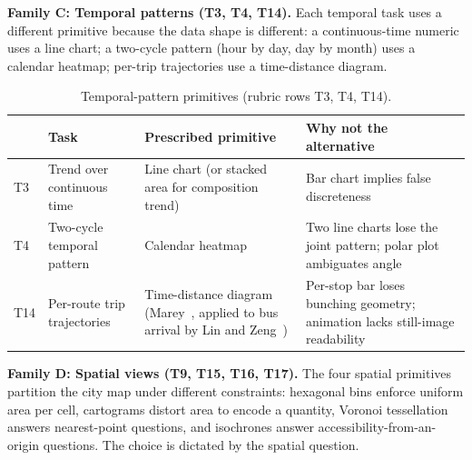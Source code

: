 \textbf{Family C: Temporal patterns (T3, T4, T14).}
Each temporal task uses a different primitive because the data shape
is different: a continuous-time numeric uses a line chart; a
two-cycle pattern (hour by day, day by month) uses a calendar
heatmap; per-trip trajectories use a time-distance diagram.

\begin{table}[!htbp]
\centering
\caption{Temporal-pattern primitives (rubric rows T3, T4, T14).}
\label{tab:foundations:rubric:time}
\footnotesize
\renewcommand{\arraystretch}{1.25}
\begin{tabularx}{\linewidth}{p{0.5cm} p{4.0cm} X X}
\hline
& \textbf{Task} & \textbf{Prescribed primitive} & \textbf{Why not the alternative} \\
\hline
T3  & Trend over continuous time          & Line chart (or stacked area for composition trend)             & Bar chart implies false discreteness \\
T4  & Two-cycle temporal pattern          & Calendar heatmap                                               & Two line charts lose the joint pattern; polar plot ambiguates angle \\
T14 & Per-route trip trajectories         & Time-distance diagram (Marey~\cite{marey1885}, applied to bus arrival by Lin and Zeng~\cite{linzeng2014})               & Per-stop bar loses bunching geometry; animation lacks still-image readability \\
\hline
\end{tabularx}
\end{table}

\textbf{Family D: Spatial views (T9, T15, T16, T17).}
The four spatial primitives partition the city map under different
constraints: hexagonal bins enforce uniform area per cell, cartograms
distort area to encode a quantity, Voronoi tessellation answers
nearest-point questions, and isochrones answer accessibility-from-an-
origin questions. The choice is dictated by the spatial question.

